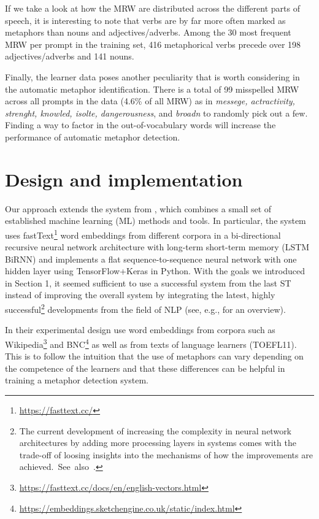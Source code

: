 \documentclass[11pt,a4paper]{article}
\begin{document}
If we take a look at how the MRW are distributed across the different parts of speech, it is interesting to note that verbs are by far more often marked as metaphors than nouns and adjectives/adverbs. Among the 30 most frequent MRW per prompt in the training set, 416 metaphorical verbs precede over 198 adjectives/adverbs and 141 nouns.

Finally, the learner data poses another peculiarity that is worth considering in the automatic metaphor identification. There is a total of 99 misspelled MRW across all prompts in the data (4.6\% of all MRW) as in \emph{messege, actractivity, strenght, knowled, isolte, dangerousness}, and \emph{broadn} to randomly pick out a few. Finding a way to factor in the out-of-vocabulary words will increase the performance of automatic metaphor detection. 


\section{Design and implementation}

Our approach extends the system from \citet{stemle-onysko:2018:naacl-flpst}, which combines a small set of established machine learning (ML) methods and tools. In particular, the system uses fastText\footnote{\url{https://fasttext.cc/}} word embeddings from different corpora in a bi-directional recursive neural network architecture with long-term short-term memory (LSTM BiRNN) and implements a flat sequence-to-sequence neural network with one hidden layer using TensorFlow+Keras \citep{tensorflow2015-whitepaper} in Python. 
With the goals we introduced in Section 1, it seemed sufficient to use a successful system from the last ST instead of improving the overall system by integrating the latest, highly successful\footnote{The current development of increasing the complexity in neural network architectures by adding more processing layers in systems comes with the trade-off of loosing insights into the mechanisms of how the improvements are achieved.~See~also~\citet{mikolov:2020:ComplexitySimplicityMachine-talk}.} developments from the field of NLP (see, e.g., \citealp{wang-EtAl:2020:StaticDynamicWord} for an overview).

In their experimental design \citet{stemle-onysko:2018:naacl-flpst} use word embeddings from corpora such as Wikipedia\footnote{\url{https://fasttext.cc/docs/en/english-vectors.html}} and BNC\footnote{\url{https://embeddings.sketchengine.co.uk/static/index.html}} as well as from texts of language learners (TOEFL11). This is to follow the intuition that the use of metaphors can vary depending on the competence of the learners and that these differences can be helpful in training a metaphor detection system.
\end{document}
